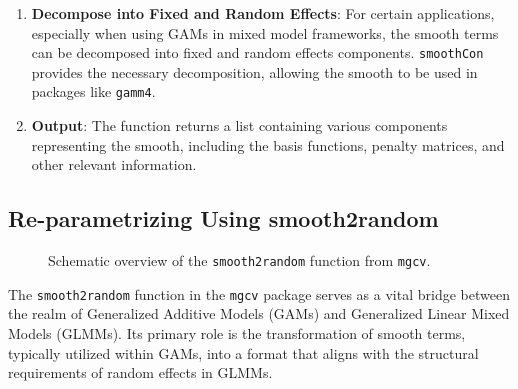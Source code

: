 \documentclass[12pt, twoside,hidelinks]{article}
\theoremstyle{definition}
\numberwithin{equation}{section}
\begin{document}
\begin{enumerate}[label=\arabic*., left=0pt]
    \item \textbf{Decompose into Fixed and Random Effects}: For certain applications, especially when using GAMs in mixed model frameworks, the smooth terms can be decomposed into fixed and random effects components. \texttt{smoothCon} provides the necessary decomposition, allowing the smooth to be used in packages like \texttt{gamm4}.
    
    \item \textbf{Output}: The function returns a list containing various components representing the smooth, including the basis functions, penalty matrices, and other relevant information.
\end{enumerate}


\subsection{Re-parametrizing Using smooth2random}

\begin{figure}[h]
\centering
{}
\caption{Schematic overview of the \texttt{smooth2random} function from \texttt{mgcv}.}
\end{figure}

The \texttt{smooth2random} function in the \texttt{mgcv} package serves as a vital bridge between the realm of Generalized Additive Models (GAMs) and Generalized Linear Mixed Models (GLMMs). Its primary role is the transformation of smooth terms, typically utilized within GAMs, into a format that aligns with the structural requirements of random effects in GLMMs.
\end{document}

